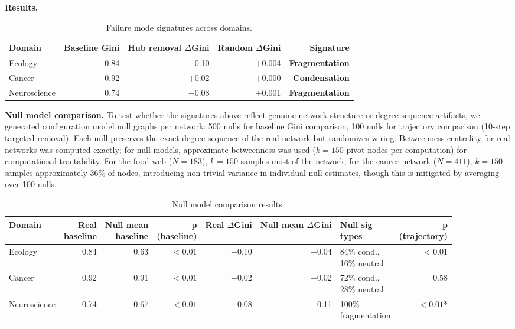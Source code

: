 \documentclass[12pt,a4paper]{article}
\begin{document}
\textbf{Results.}

\begin{table}[htbp]
\centering
\begin{tabular}{@{}lrrrr@{}}
\toprule
Domain & Baseline Gini & Hub removal $\Delta$Gini & Random $\Delta$Gini & Signature \\
\midrule
Ecology & 0.84 & $-$0.10 & $+$0.004 & \textbf{Fragmentation} \\
Cancer & 0.92 & $+$0.02 & $+$0.000 & \textbf{Condensation} \\
Neuroscience & 0.74 & $-$0.08 & $+$0.001 & \textbf{Fragmentation} \\
\bottomrule
\end{tabular}
\caption{Failure mode signatures across domains.}
\label{tab:results}
\end{table}

\textbf{Null model comparison.} To test whether the signatures above reflect genuine network structure or degree-sequence artifacts, we generated configuration model null graphs per network: 500 nulls for baseline Gini comparison, 100 nulls for trajectory comparison (10-step targeted removal). Each null preserves the exact degree sequence of the real network but randomizes wiring. Betweenness centrality for real networks was computed exactly; for null models, approximate betweenness was used ($k = 150$ pivot nodes per computation) for computational tractability. For the food web ($N = 183$), $k = 150$ samples most of the network; for the cancer network ($N = 411$), $k = 150$ samples approximately 36\% of nodes, introducing non-trivial variance in individual null estimates, though this is mitigated by averaging over 100 nulls.

\begin{table}[htbp]
\centering
\small
\begin{tabular}{@{}lrrrrrlr@{}}
\toprule
Domain & \makecell[r]{Real\\baseline} & \makecell[r]{Null mean\\baseline} & \makecell[r]{p\\(baseline)} & \makecell[r]{Real\\$\Delta$Gini} & \makecell[r]{Null mean\\$\Delta$Gini} & \makecell[l]{Null sig\\types} & \makecell[r]{p\\(trajectory)} \\
\midrule
Ecology & 0.84 & 0.63 & ${<}0.01$ & $-$0.10 & $+$0.04 & \makecell[l]{84\% cond.,\\16\% neutral} & ${<}0.01$ \\[6pt]
Cancer & 0.92 & 0.91 & ${<}0.01$ & $+$0.02 & $+$0.02 & \makecell[l]{72\% cond.,\\28\% neutral} & $0.58$ \\[6pt]
Neuroscience & 0.74 & 0.67 & ${<}0.01$ & $-$0.08 & $-$0.11 & \makecell[l]{100\%\\fragmentation} & ${<}0.01$* \\
\bottomrule
\end{tabular}
\caption{Null model comparison results.}
\label{tab:null-model}
\end{table}
\end{document}
